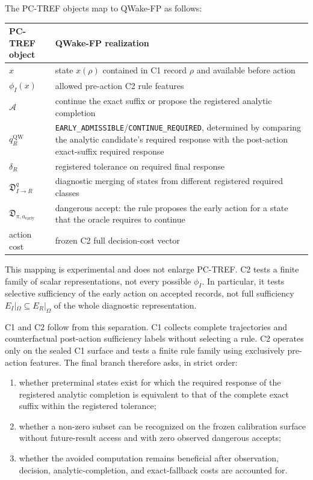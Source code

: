 The PC-TREF objects map to QWake-FP as follows:
\begin{center}
\small
\begin{tabular}{p{}p{}}
\toprule
PC-TREF object & QWake-FP realization \\
\midrule
$x$ & state $x(\rho)$ contained in C1 record $\rho$ and available before action \\
$\phi_I(x)$ & allowed pre-action C2 rule features \\
$\mathcal A$ & continue the exact suffix or propose the registered analytic completion \\
$q_R^{\mathrm{QW}}$ & \texttt{EARLY\_ADMISSIBLE}/\texttt{CONTINUE\_REQUIRED}, determined by comparing the analytic candidate's required response with the post-action exact-suffix required response \\
$\delta_R$ & registered tolerance on required final response \\
$\mathfrak D_{I\to R}^{q}$ & diagnostic merging of states from different registered required classes \\
$\mathfrak D_{\pi,a_{\mathrm{early}}}$ & dangerous accept: the rule proposes the early action for a state that the oracle requires to continue \\
action cost & frozen C2 full decision-cost vector \\
\bottomrule
\end{tabular}
\end{center}
This mapping is experimental and does not enlarge PC-TREF. C2 tests a finite family of
scalar representations, not every possible $\phi_I$. In particular, it tests selective
sufficiency of the early action on accepted records, not full sufficiency
$E_I|_\Omega\subseteq E_R|_\Omega$ of the whole diagnostic representation.

C1 and C2 follow from this separation. C1 collects complete trajectories and
counterfactual post-action sufficiency labels without selecting a rule. C2 operates
only on the sealed C1 surface and tests a finite rule family using exclusively
pre-action features. The final branch therefore asks, in strict order:
\begin{enumerate}
  \item whether preterminal states exist for which the required response of the registered analytic completion is equivalent to that of the complete exact suffix within the registered tolerance;
  \item whether a non-zero subset can be recognized on the frozen calibration surface without future-result access and with zero observed dangerous accepts;
  \item whether the avoided computation remains beneficial after observation, decision, analytic-completion, and exact-fallback costs are accounted for.
\end{enumerate}

